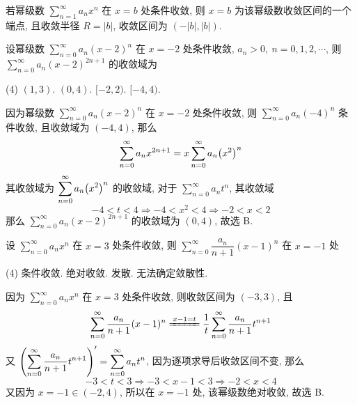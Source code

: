 \begin{theorem}[幂级数的条件收敛]
    若幂级数 $ \displaystyle \sum_{n=1}^{\infty} a_nx^n $ 在 $x=b$ 处条件收敛, 则 $x=b$ 为该幂级数收敛区间的一个端点, 且收敛半径 $R=|b|$, 收敛区间为 $(-|b|,|b|)$.
\end{theorem}

\begin{example}
    设幂级数 $\displaystyle \sum_{n=0}^{\infty} a_n(x-2)^n$ 在 $x=-2$ 处条件收敛, $a_n>0,~n=0, 1, 2, \cdots $, 则 $\displaystyle \sum_{n=0}^{\infty} a_n(x-2)^{2n+1}$ 的收敛域为
    \begin{tasks}(4)
        \task $(1,3)$.
        \task $(0,4)$.
        \task $[-2,2)$.
        \task $[-4,4)$.
    \end{tasks}
\end{example}
\begin{solution}
    因为幂级数 $\displaystyle \sum_{n=0}^{\infty} a_n(x-2)^n$ 在 $x=-2$ 处条件收敛, 则 $\displaystyle \sum_{n=0}^{\infty} a_n(-4)^n$ 条件收敛, 且收敛域为 $(-4,4)$, 那么
    $$
        \sum_{n=0}^{\infty} a_n x^{2n+1}=x\sum_{n=0}^{\infty} a_n \qty(x^2)^{n}
    $$
    其收敛域为 $\displaystyle \sum_{n=0}^{\infty} a_n\qty(x^2)^n$ 的收敛域, 对于 $\displaystyle \sum_{n=0}^{\infty} a_nt^n$, 其收敛域
    $$-4<t<4\Rightarrow -4<x^2<4\Rightarrow -2<x<2$$
    那么 $\displaystyle \sum_{n=0}^{\infty} a_n(x-2)^{2n+1}$ 的收敛域为 $(0,4)$, 故选 B.
\end{solution}

\begin{example}
    设 $ \displaystyle \sum_{n=0}^{\infty} a_nx^n $ 在 $x=3$ 处条件收敛, 则 $ \displaystyle \sum_{n=0}^{\infty} \dfrac{a_n}{n+1}(x-1)^n $ 在 $x=-1$ 处
    \begin{tasks}(4)
        \task 条件收敛.
        \task 绝对收敛.
        \task 发散.
        \task 无法确定敛散性.
    \end{tasks}
\end{example}
\begin{solution}
    因为 $ \displaystyle \sum_{n=0}^{\infty} a_nx^n $ 在 $x=3$ 处条件收敛, 则收敛区间为 $(-3,3)$, 且
    $$
        \sum_{n=0}^{\infty} \dfrac{a_n}{n+1}(x-1)^{n}\xlongequal{x-1=t}\dfrac{1}{t}\sum_{n=0}^{\infty} \dfrac{a_n}{n+1}t^{n+1}
    $$
    又 $ \displaystyle \qty(\sum_{n=0}^{\infty} \dfrac{a_n}{n+1}t^{n+1})' =\sum_{n=0}^{\infty} a_nt^n$, 因为逐项求导后收敛区间不变, 那么
    $$
        -3<t<3\Rightarrow -3<x-1<3\Rightarrow -2<x<4
    $$
    又因为 $x=-1\in(-2,4)$, 所以在 $x=-1$ 处, 该幂级数绝对收敛, 故选 B.
\end{solution}

